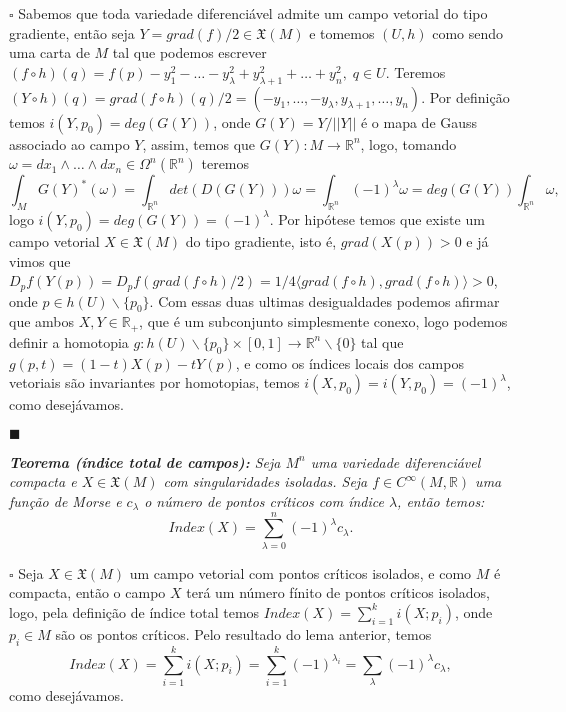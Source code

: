 \documentclass{article}
\begin{document}
	$\square$ Sabemos que toda variedade diferenciável admite um campo vetorial do tipo gradiente, então seja $Y =  grad(f)/2 \in \mathfrak{X}(M)$ e tomemos $(U, h)$ como sendo uma carta de $M$ tal que podemos escrever $(f \circ h) (q) = f(p) - y_{1}^{2} - \dots - y_{\lambda}^{2} + y_{\lambda+1}^{2} + \dots + y_{n}^{2}, \; q \in U$. Teremos $(Y \circ h)(q) = grad(f\circ h)(q)/2 = (-y_{1}, \dots, -y_{\lambda}, y_{\lambda+1}, \dots, y_{n})$. Por definição temos $i(Y, p_{0}) = deg(G(Y))$, onde $G(Y) = Y/||Y||$ é o mapa de Gauss associado ao campo $Y$, assim, temos que $G(Y):M \to \mathbb{R}^n$, logo, tomando $\omega  = dx_{1} \wedge \dots \wedge dx_{n} \in \Omega^{n}(\mathbb{R}^{n})$ teremos 
	$$
	\int_{M} G(Y)^{*}(\omega) = \int_{\mathbb{R}^{n}} det(D(G(Y))) \omega = \int_{\mathbb{R}^{n}} (-1)^{\lambda} \omega =    deg(G(Y))\int_{\mathbb{R}^{n}} \omega, 
	$$
	logo $i(Y, p_{0}) = deg(G(Y)) = (-1)^{\lambda}$. Por hipótese temos que existe um campo vetorial $X \in \mathfrak{X}(M)$ do tipo gradiente, isto é, $grad(X(p)) > 0$ e já vimos que $D_{p}f(Y(p)) = D_{p}f(grad(f \circ h)/2) = 1/4\langle grad(f\circ h), grad(f\circ h) \rangle>0$, onde $p \in h(U)\backslash\{p_{0}\}$. Com essas duas ultimas desigualdades podemos afirmar que ambos $X, Y \in \mathbb{R}_{+}$, que é um subconjunto simplesmente conexo, logo podemos definir a homotopia $g: h(U)\backslash\{p_{0}\} \times [0,1] \to \mathbb{R}^{n}\backslash \{0\}$ tal que $g(p, t) = (1-t)X(p) - tY(p)$, e como os índices locais dos campos vetoriais são invariantes por homotopias, temos $i(X, p_{0}) = i(Y, p_{0}) = (-1)^{\lambda}$, como desejávamos.
	
	$\blacksquare$
	
	\vspace{2mm}
	\textit{\textbf{Teorema (índice total de campos):} Seja $M^{n}$ uma variedade diferenciável compacta e $X \in \mathfrak{X}(M)$ com singularidades isoladas. Seja $f \in C^{\infty}(M, \mathbb{R})$ uma função de Morse e $c_{\lambda}$ o número de pontos críticos com índice $\lambda$, então temos:}
	$$
	Index(X) = \sum_{\lambda = 0}^{n}(-1)^{\lambda}c_{\lambda}.
	$$
	
	$\square$ Seja $X \in \mathfrak{X}(M)$ um campo vetorial com pontos críticos isolados, e como $M$ é compacta, então o campo $X$ terá um número fínito de pontos críticos isolados, logo, pela definição de índice total temos $Index(X) = \sum_{i=1}^{k} i(X;p_{i})$, onde $p_{i} \in M$ são os pontos críticos. Pelo resultado do lema anterior, temos
	$$
	Index(X) = \sum_{i=1}^{k} i(X;p_{i}) = \sum_{i=1}^{k} (-1)^{\lambda_{i}} = \sum_{\lambda}(-1)^{\lambda}c_{\lambda},
	$$
	como desejávamos.
	
\end{document}
